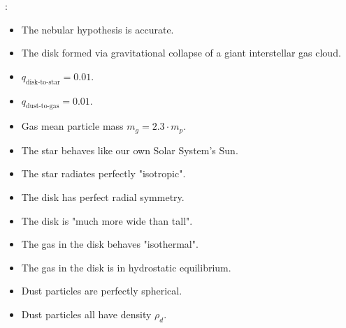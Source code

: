 \underline{}:
\begin{itemize}
    \item The nebular hypothesis is accurate. 
    \item The disk formed via gravitational collapse of a giant interstellar gas cloud.
    \item $q_\text{disk-to-star}=0.01$.
    \item $q_\text{dust-to-gas}=0.01$.
    \item Gas mean particle mass $m_g=2.3\cdot m_p$.
    \item The star behaves like our own Solar System's Sun.
    \item The star radiates perfectly "isotropic".
    \item The disk has perfect radial symmetry.
    \item The disk is "much more wide than tall".
    \item The gas in the disk behaves "isothermal".
    \item The gas in the disk is in hydrostatic equilibrium.
    \item Dust particles are perfectly spherical.
    \item Dust particles all have density $\rho_d$.
\end{itemize}
